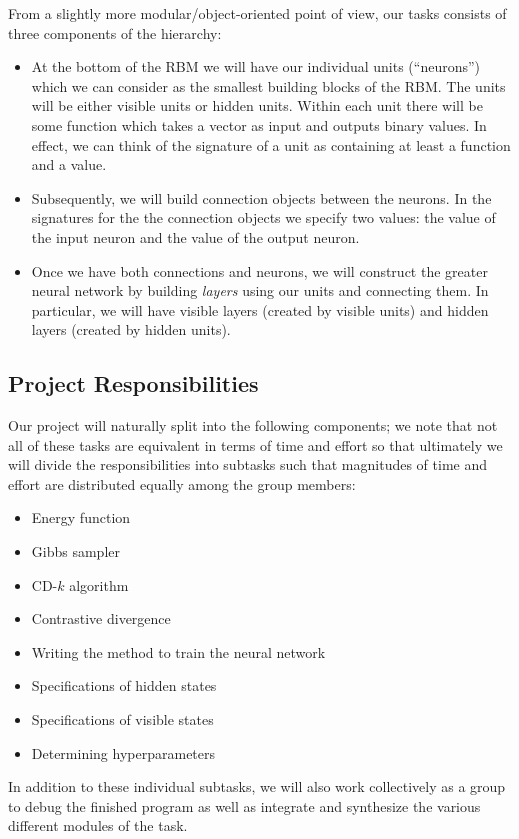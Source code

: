 From a slightly more modular/object-oriented point of view, our tasks consists of three components of the hierarchy:
\begin{itemize}
  \item At the bottom of the RBM we will have our individual units (``neurons'') which we can consider as the smallest building blocks of the RBM. The units will be either visible units or hidden units. Within each unit there will be some function which takes a vector as input and outputs binary values. In effect, we can think of the signature of a unit as containing at least a function and a value.
  \item Subsequently, we will build connection objects between the neurons. In the signatures for the the connection objects we specify two values: the value of the input neuron and the value of the output neuron.
  \item Once we have both connections and neurons, we will construct the greater neural network by building \textit{layers} using our units and connecting them. In particular, we will have visible layers (created by visible units) and hidden layers (created by hidden units).
\end{itemize}

\subsection{Project Responsibilities}
Our project will naturally split into the following components; we note that not all of these tasks are equivalent in terms of time and effort so that ultimately we will divide the responsibilities into subtasks such that magnitudes of time and effort are distributed equally among the group members:
\begin{itemize}
  \item Energy function
  \item Gibbs sampler
  \item CD-$k$ algorithm
  \item Contrastive divergence
  \item Writing the method to train the neural network
  \item Specifications of hidden states
  \item Specifications of visible states
  \item Determining hyperparameters
\end{itemize}

In addition to these individual subtasks, we will also work collectively as a group to debug the finished program as well as integrate and synthesize the various different modules of the task.


